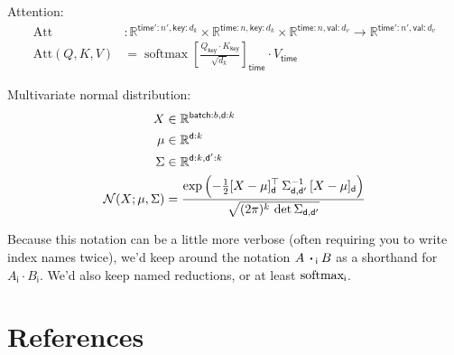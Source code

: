 \documentclass{article}
\newcommand{\name}[1]{\mathsf{#1}}
\newcommand{\ndot}[1]{\mathbin{\mathop{\thinspace\boldsymbol\cdot\thinspace}\displaylimits_{\name{#1}}}}
\newcommand{\nfun}[2]{\mathop{\text{#2}}\displaylimits_{\name{#1}}}
\DeclareMathOperator*{\softmax}{softmax}
\begin{document}
Attention:
\begin{align*}
  \text{Att} &\colon \mathbb{R}^{\name{time'}:n',\name{key}:d_k} \times \mathbb{R}^{\name{time}:n,\name{key}:d_k} \times \mathbb{R}^{\name{time}:n,\name{val}:d_v} \rightarrow \mathbb{R}^{\name{time'}:n',\name{val}:d_v} \\
  \text{Att}(Q,K,V) &= \softmax \left[ \frac{Q_{\name{key}} \cdot K_\name{key}}{\sqrt{d_k}} \right]_{\name{time}} \cdot V_{\name{time}}
\end{align*}

Multivariate normal distribution:
\begin{align*} 
X &\in \mathbb{R}^{\name{batch}:{b}, \name{d}:{k}}  \\
\mu &\in \mathbb{R}^{{\name{d}:{k}}}  \\
\Sigma & \in   \mathbb{R}^{{\name{d}:{k}, \name{d'}:{k}}}  \\
{\cal N}(X; \mu, \Sigma) &= \frac{\displaystyle \exp\left(-\tfrac{1}{2} [X - \mu]_{\name{d}}^\top \, \Sigma_{\name{d},\name{d'}}^{-1} \, [X - \mu]_{\name{d}} \right) }{\sqrt{(2 \pi)^k \, \mathop{\text{det}} \Sigma_{\name{d},\name{d'}}} }
\end{align*}

Because this notation can be a little more verbose (often requiring you to write index names twice), we'd keep around the notation $A \ndot{i} B$ as a shorthand for $A_{\name{i}} \cdot B_{\name{i}}$. We'd also keep named reductions, or at least $\nfun{i}{softmax}$.

\section*{References}



\end{document}
